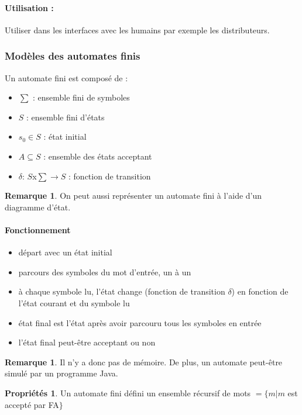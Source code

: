 \documentclass[11pt,a4paper]{article}
\theoremstyle{definition}
\newtheorem{myprop}[mydef]{Propriétés}
\newtheorem{myrem}[mydef]{Remarque}
\begin{document}
\paragraph{Utilisation :} Utiliser dans les interfaces avec les humains par 
exemple les distributeurs.

\subsubsection{Modèles des automates finis}
\label{ssub:mod_les_des_automates_finis}
Un automate fini est composé de :

\begin{itemize}
	\item $\sum$ : ensemble fini de symboles
	\item $S$ : ensemble fini d'états
	\item $s_0 \in S$ : état initial
	\item $A \subseteq S$ : ensemble des états acceptant
	\item $\delta$: $S$x$\sum \rightarrow S$ : fonction de transition
\end{itemize}

\begin{myrem}
	On peut aussi représenter un automate fini à l'aide d'un diagramme 
	d'état.
\end{myrem}

\paragraph{Fonctionnement}
\begin{itemize}
	\item départ avec un état initial
	\item parcours des symboles du mot d'entrée, un à un
	\item à chaque symbole lu, l'état change (fonction de transition 
		$\delta$) en fonction de l'état courant et du symbole lu
	\item état final est l'état après avoir parcouru tous les symboles en 
		entrée
	\item l'état final peut-être acceptant ou non
\end{itemize}

\begin{myrem}
	Il n'y a donc pas de mémoire. De plus, un automate peut-être simulé 
	par un programme Java.
\end{myrem}

\begin{myprop}
	Un automate fini défini un ensemble récursif de mots $=\{m|m$ est 
		accepté par FA$\}$
\end{myprop}
\end{document}
